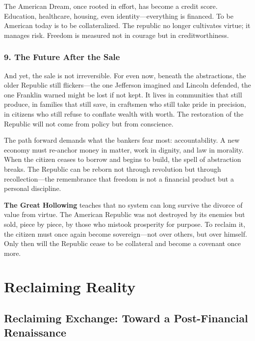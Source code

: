 \documentclass[11pt,twoside]{book}
\begin{document}
The American Dream, once rooted in effort, has become a credit score.  
Education, healthcare, housing, even identity—everything is financed.  
To be American today is to be collateralized.  
The republic no longer cultivates virtue; it manages risk.  
Freedom is measured not in courage but in creditworthiness.

\section*{9. The Future After the Sale}

And yet, the sale is not irreversible.  
For even now, beneath the abstractions, the older Republic still flickers—the one Jefferson imagined and Lincoln defended, the one Franklin warned might be lost if not kept.  
It lives in communities that still produce, in families that still save, in craftsmen who still take pride in precision, in citizens who still refuse to conflate wealth with worth.  
The restoration of the Republic will not come from policy but from conscience.

The path forward demands what the bankers fear most: accountability.  
A new economy must re-anchor money in matter, work in dignity, and law in morality.  
When the citizen ceases to borrow and begins to build, the spell of abstraction breaks.  
The Republic can be reborn not through revolution but through recollection—the remembrance that freedom is not a financial product but a personal discipline.

\textbf{The Great Hollowing} teaches that no system can long survive the divorce of value from virtue.  
The American Republic was not destroyed by its enemies but sold, piece by piece, by those who mistook prosperity for purpose.  
To reclaim it, the citizen must once again become sovereign—not over others, but over himself.  
Only then will the Republic cease to be collateral and become a covenant once more.

\part{Reclaiming Reality}
% 
\chapter{Reclaiming Exchange: Toward a Post-Financial Renaissance}
\label{ch:38}
\end{document}
